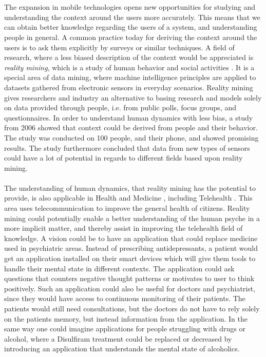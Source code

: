 \\\\
The expansion in mobile technologies opens new opportunities for studying and understanding the context around the users more accurately. This means that we can obtain better knowledge regarding the users of a system, and understanding people in general. A common practice today for deriving the context around the users is to ask them explicitly by surveys or similar techniques. A field of research, where a less biased description of the context would be appreciated is \emph{reality mining}, which is a study of human behavior and social activities \parencite{madan2009_reality_mining_privacy}. It is a special area of data mining, where machine intelligence principles are applied to datasets gathered from electronic sensors in everyday scenarios. Reality mining gives researchers and industry an alternative to basing research and models solely on data provided through people, i.e. from public polls, focus groups, and questionnaires. In order to understand human dynamics with less bias, a study from 2006 \parencite{eagle2006_reality_mining_definition} showed that context could be derived from people and their behavior. The study was conducted on 100 people, and their phone, and showed promising results. The study furthermore concluded that data from new types of sensors could have a lot of potential in regards to different fields based upon reality mining. 
\\\\
The understanding of human dynamics, that reality mining has the potential to provide, is also applicable in Health and Medicine \parencite{pentland2009_reality_mining_health_medicine}, including Telehealth \parencite{telehealth_aau}. This area uses telecommunication to improve the general health of citizens. Reality mining could potentially enable a better understanding of the human psyche in a more implicit matter, and thereby assist in improving the telehealth field of knowledge. A vision could be to have an application that could replace medicine used in psychiatric areas. Instead of prescribing antidepressants, a patient would get an application installed on their smart devices which will give them tools to handle their mental state in different contexts. The application could ask questions that counters negative thought patterns or motivates to user to think positively. Such an application could also be useful for doctors and psychiatrist, since they would have access to continuous monitoring of their patients. The patients would still need consultations, but the doctors do not have to rely solely on the patients memory, but instead information from the application. In the same way one could imagine applications for people struggling with drugs or alcohol, where a Disulfiram \parencite{nlm_disulfiram} treatment could be replaced or decreased by introducing an application that understands the mental state of alcoholics.
